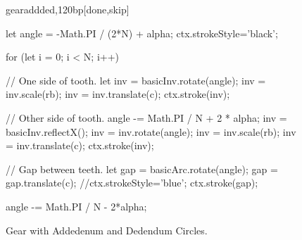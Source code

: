 \documentclass[10pt]{article}
\begin{document}
\begin{figure}[b!]
\begin{figput}{gearaddded,120bp}[done,skip]
{  let angle = -Math.PI / (2*N) + alpha;
  ctx.strokeStyle='black';

  for (let i = 0; i < N; i++)
    {
      // One side of tooth.
      let inv = basicInv.rotate(angle);
      inv = inv.scale(rb);
      inv = inv.translate(c);
      ctx.stroke(inv);

      // Other side of tooth.
      angle -= Math.PI / N + 2 * alpha;
      inv = basicInv.reflectX();
      inv = inv.rotate(angle);
      inv = inv.scale(rb);
      inv = inv.translate(c);
      ctx.stroke(inv);

      // Gap between teeth.
      let gap = basicArc.rotate(angle);
      gap = gap.translate(c);
      //ctx.strokeStyle='blue';
      ctx.stroke(gap);

      angle -= Math.PI / N - 2*alpha;
    }
}

\end{figput}
\caption{Gear with Addedenum and Dedendum Circles.}
\label{fig-gear-with-add-ded}
\end{figure}
\end{document}
